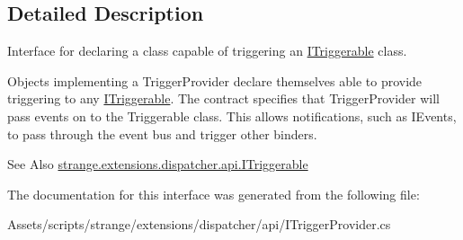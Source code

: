 \subsection{Detailed Description}
Interface for declaring a class capable of triggering an \hyperlink{interfacestrange_1_1extensions_1_1dispatcher_1_1api_1_1_i_triggerable}{I\-Triggerable} class. 

Objects implementing a Trigger\-Provider declare themselves able to provide triggering to any \hyperlink{interfacestrange_1_1extensions_1_1dispatcher_1_1api_1_1_i_triggerable}{I\-Triggerable}. The contract specifies that Trigger\-Provider will pass events on to the Triggerable class. This allows notifications, such as I\-Events, to pass through the event bus and trigger other binders.

\begin{DoxySeeAlso}{See Also}
\hyperlink{interfacestrange_1_1extensions_1_1dispatcher_1_1api_1_1_i_triggerable}{strange.\-extensions.\-dispatcher.\-api.\-I\-Triggerable} 
\end{DoxySeeAlso}


The documentation for this interface was generated from the following file\-:\begin{DoxyCompactItemize}
\item 
Assets/scripts/strange/extensions/dispatcher/api/I\-Trigger\-Provider.\-cs\end{DoxyCompactItemize}
